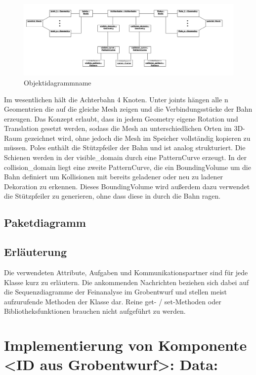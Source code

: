 \begin{figure}
\includegraphics[width=\linewidth]{bilder/objektdiagramm_004}
\caption{Objektidagrammname}
\end{figure}

Im wesentlichen hält die Achterbahn 4 Knoten. Unter joints hängen alle n Geomentrien die auf die gleiche Mesh zeigen und die Verbindungsstücke der Bahn erzeugen. Das Konzept erlaubt, dass in jedem Geometry eigene Rotation und 
Translation gesetzt werden, sodass die Mesh an unterschiedlichen Orten im 3D-Raum gezeichnet wird, ohne jedoch die Mesh im Speicher vollständig kopieren zu müssen. Poles enthält die Stützpfeiler der Bahn und ist analog strukturiert.
Die Schienen werden in der visible\_domain durch eine PatternCurve erzeugt. In der collision\_domain liegt eine zweite PatternCurve, die ein BoundingVolume um die Bahn definiert um Kollisionen mit bereits geladener oder neu zu ladener
Dekoration zu erkennen. Dieses BoundingVolume wird außerdem dazu verwendet die Stützpfeiler zu generieren, ohne dass diese in durch die Bahn ragen.



\subsection{Paketdiagramm}
\subsection{Erläuterung}

Die verwendeten Attribute, Aufgaben und Kommunikationspartner sind für jede
Klasse kurz zu erläutern. Die ankommenden Nachrichten beziehen sich dabei auf
die Sequenzdiagramme der Feinanalyse im Grobentwurf und stellen meist
aufzurufende Methoden der Klasse dar.  Reine get- / set-Methoden oder
Bibliotheksfunktionen brauchen nicht aufgeführt zu werden.

\section{Implementierung von Komponente
         <ID aus Grobentwurf>: Data:}


